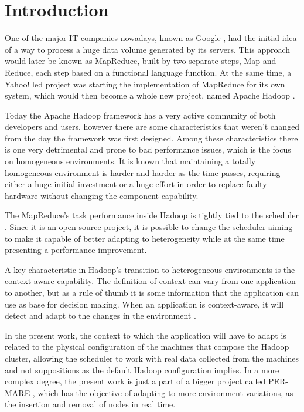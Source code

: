 \chapter{Introduction}
\label{chap:Introduction}
One of the major IT companies nowadays, known as Google \cite{Google}, had the initial idea of a way to process a huge data volume generated by its servers. This approach would later be known as MapReduce, built by two separate steps, Map and Reduce, each step based on a functional language function. At the same time, a Yahoo! \cite{Yahoo} led project was starting the implementation of MapReduce for its own system, which would then become a whole new project, named Apache Hadoop \cite{Hadoop}.

Today the Apache Hadoop framework has a very active community of both developers and users, however there are some characteristics that weren't changed from the day the framework was first designed. Among these characteristics there is one very detrimental and prone to bad performance issues, which is the focus on homogeneous environments. It is known that maintaining a totally homogeneous environment is harder and harder as the time passes, requiring either a huge initial investment or a huge effort in order to replace faulty hardware without changing the component capability.

The MapReduce's task performance inside Hadoop is tightly tied to the scheduler \cite{CASH}. Since it is an open source project, it is possible to change the scheduler aiming to make it capable of better adapting to heterogeneity while at the same time presenting a performance improvement.

A key characteristic in Hadoop's transition to heterogeneous environments is the context-aware capability. The definition of context can vary from one application to another, but as a rule of thumb it is some information that the application can use as base for decision making. When an application is context-aware, it will detect and adapt to the changes in the environment \cite{Manuele}.

In the present work, the context to which the application will have to adapt is related to the physical configuration of the machines that compose the Hadoop cluster, allowing the scheduler to work with real data collected from the machines and not suppositions as the default Hadoop configuration implies. In a more complex degree, the present work is just a part of a bigger project called PER-MARE \cite{PER-MARE}, which has the objective of adapting to more environment variations, as the insertion and removal of nodes in real time.


